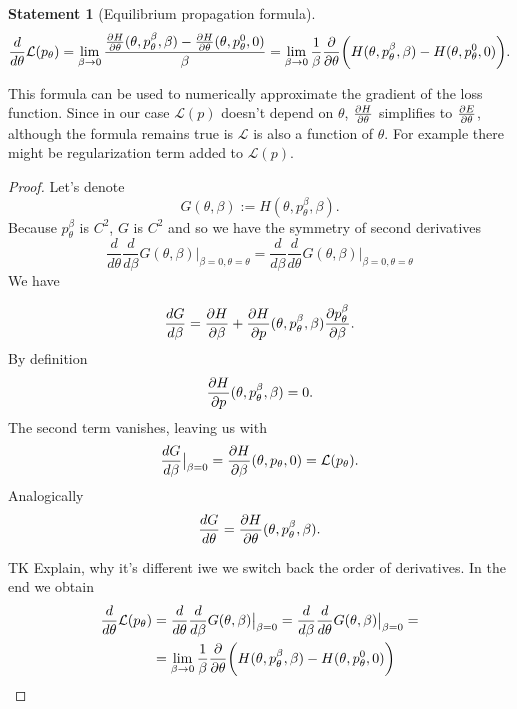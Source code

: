 \documentclass[a4paper,10pt]{report}
\newtheorem{statement}{Statement}
\begin{document}
\begin{statement}[Equilibrium propagation formula]
 \begin{equation}
 \frac{d}{d\theta} \mathcal{L}(p_\theta) = \lim_{\beta \to 0} \frac{\frac{\partial H}{\partial \theta}(\theta, p_\theta^\beta, \beta)-\frac{\partial H}{\partial \theta}(\theta, p_\theta^0, 0) }{\beta} = \lim_{\beta \to 0}\frac{1}{\beta} \frac{\partial }{\partial \theta} \bigg(H(\theta, p_\theta^\beta,\beta) - H(\theta, p_\theta^0, 0)\bigg).
\end{equation}
\end{statement}
This formula can be used to numerically approximate the gradient of the loss function.
Since in our case $\mathcal{L}(p)$ doesn't depend on $\theta$, $\frac{\partial H}{\partial \theta}$ simplifies to $\frac{\partial E}{\partial \theta}$, although the formula remains true is $\mathcal{L}$ is also a function of $\theta$. For example there might be regularization term added to $\mathcal{L}(p)$.

\begin{proof} Let's denote
 \begin{equation}
 G(\theta, \beta) := H(\theta, p_\theta^\beta, \beta).
\end{equation}
Because $p_\theta^\beta$ is $C^2$, $G$ is $C^2$ and so we have the symmetry of second derivatives
\begin{equation}
 \frac{d}{d\theta}\frac{d}{d\beta}G(\theta,\beta)\big|_{\beta=0, \theta = \theta} =\frac{d}{d\beta}\frac{d}{d\theta}G(\theta,\beta)\big|_{\beta=0, \theta = \theta}
\end{equation}
We have

\begin{equation}\label{eqcond}
 \frac{dG}{d\beta} = \frac{\partial H}{\partial \beta} + \frac{\partial H}{\partial p}(\theta,p_\theta^{\beta}, \beta)\frac{\partial p_\theta^{\beta}}{\partial \beta}.
\end{equation}
By definition
\begin{equation}
\frac{\partial H}{\partial p}(\theta,p_\theta^{\beta}, \beta)=0.
\end{equation}
The second term vanishes, leaving us with
\begin{equation}\label{pvanish}
  \frac{dG}{d\beta}\big|_{\beta=0} = \frac{\partial H}{\partial \beta}(\theta, p_\theta, 0)=\mathcal{L}(p_\theta).
\end{equation}
Analogically
\begin{equation}\label{thvanish}
 \frac{dG}{d\theta}=\frac{\partial H}{\partial \theta}(\theta, p_\theta^{\beta}, \beta).
\end{equation}

TK Explain, why it's different iwe we switch back the order of derivatives.
In the end we obtain
\begin{align}
 \frac{d}{d\theta} \mathcal{L}(p_\theta) &=\frac{d}{d\theta}\frac{d}{d\beta}G(\theta,\beta)\big|_{\beta=0} = \frac{d}{d\beta}\frac{d}{d\theta}G(\theta,\beta)\big|_{\beta=0}=\\
 &=\lim_{\beta \to 0}\frac{1}{\beta} \frac{\partial }{\partial \theta} \bigg(H(\theta, p_\theta^\beta,\beta) - H(\theta, p_\theta^0, 0)\bigg)
\end{align}

\end{proof}
\end{document}
